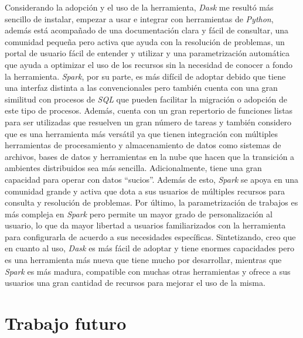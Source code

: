 Considerando la adopción y el uso de la herramienta, \textit{Dask} me resultó más sencillo de instalar, empezar a usar e integrar con herramientas de \textit{Python}, además está acompañado de una documentación clara y fácil de consultar, una comunidad pequeña pero activa que ayuda con la resolución de problemas, un portal de usuario fácil de entender y utilizar y una parametrización automática que ayuda a optimizar el uso de los recursos sin la necesidad de conocer a fondo la herramienta. \textit{Spark}, por su parte, es más difícil de adoptar debido que tiene una interfaz distinta a las convencionales pero también cuenta con una gran similitud con procesos de \textit{SQL} que pueden facilitar la migración o adopción de este tipo de procesos. Además, cuenta con un gran repertorio de funciones listas para ser utilizadas que resuelven un gran número de tareas y también considero que es una herramienta más versátil ya que tienen integración con múltiples herramientas de procesamiento y almacenamiento de datos como sistemas de archivos, bases de datos y herramientas en la nube que hacen que la transición a ambientes distribuidos sea más sencilla. Adicionalmente, tiene una gran capacidad para operar con datos ``sucios''. Además de esto, \textit{Spark} se apoya en una comunidad grande y activa que dota a sus usuarios de múltiples recursos para consulta y resolución de problemas. Por último, la parametrización de trabajos es más compleja en \textit{Spark} pero permite un mayor grado de personalización al usuario, lo que da mayor libertad a usuarios familiarizados con la herramienta para configurarla de acuerdo a sus necesidades específicas. Sintetizando, creo que en cuanto al uso, \textit{Dask} es más fácil de adoptar y tiene enormes capacidades pero es una herramienta más nueva que tiene mucho por desarrollar, mientras que \textit{Spark} es más madura, compatible con muchas otras herramientas y ofrece a sus usuarios una gran cantidad de recursos para mejorar el uso de la misma.
 


\section{Trabajo futuro}

